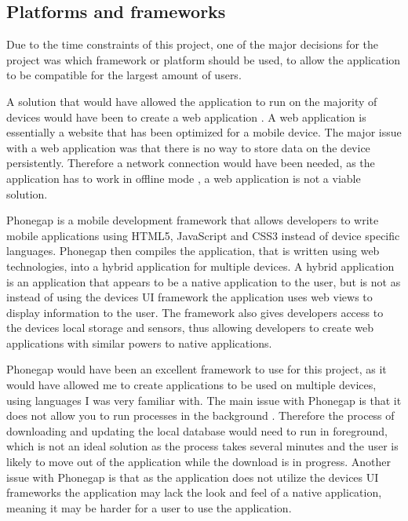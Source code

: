 \subsection{Platforms and frameworks}
Due to the time constraints of this project, one of the major decisions for the project was which framework or platform should be used, to allow the application to be compatible for the largest amount of users.

A solution that would have allowed the application to run on the majority of devices would have been to create a web application \cite{web_app}. A web application \cite{web_app} is essentially a website that has been optimized for a mobile device. The major issue with a web application was that there is no way to store data on the device persistently. Therefore a network connection would have been needed, as the application has to work in offline mode \cite{mobile_inter}, a web application is not a viable solution. 

Phonegap \cite{phonegap} is a mobile development framework that allows developers to write mobile applications using HTML5, JavaScript and CSS3 instead of device specific languages. Phonegap \cite{phonegap} then compiles the application, that is written using web technologies, into a hybrid application \cite{hybrid_application} for multiple devices. A hybrid application \cite{hybrid_application} is an application that appears to be a native application to the user, but is not as instead of using the devices UI framework the application uses web views to display information to the user. The framework also gives developers access to the devices local storage and sensors, thus allowing developers to create web applications with similar powers to native applications. 

Phonegap \cite{phonegap} would have been an excellent framework to use for this project, as it would have allowed me to create applications to be used on multiple devices, using languages I was very familiar with. The main issue with Phonegap is that it does not allow you to run processes in the background \cite{phonegap_background}. Therefore the process of downloading and updating the local database would need to run in foreground, which is not an ideal solution as the process takes several minutes and the user is likely to move out of the application while the download is in progress. Another issue with Phonegap \cite{phonegap} is that as the application does not utilize the devices UI frameworks the application may lack the look and feel of a native application, meaning it may be harder for a user to use the application.

